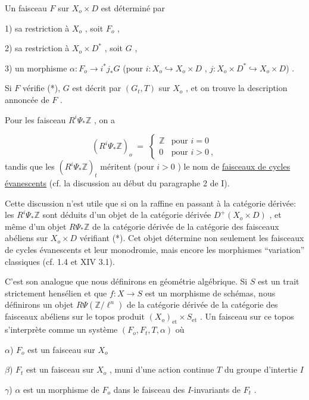 Un faisceau $F$ sur $X_o \times D$ est déterminé par

1) sa restriction à $X_o$ , soit $F_o$ ,

2) sa restriction à $X_o \times D^*$ , soit $G$ ,

3) un morphisme $\alpha : F_o \longrightarrow i^*j_*G$ (pour $i : X_o \hookrightarrow X_o \times D$ , $j : X_o \times D^* \hookrightarrow X_o \times D$) .

Si $F$ vérifie (*), $G$ est décrit par $(G_t, T)$ sur $X_o$ , et on trouve la description annoncée de $F$ .

Pour les faisceau $R^i \Psi_* \mathbb{Z}$ , on a

\begin{equation*}
(R^i \Psi_* \mathbb{Z})_o \;=\; \begin{cases} \mathbb{Z} & \text{pour } i = 0 \\ 0 & \text{pour } i > 0 \ , \end{cases}
\end{equation*}
tandis que les $(R^i \Psi_* \mathbb{Z} )_t$ méritent (pour $i > 0$ ) le nom de \underline{faisceaux de cycles évanescents} (cf. la discussion au début du paragraphe 2 de I).



Cette discussion n'est utile que si on la raffine en passant à la catégorie dérivée: les $R^i \Psi_* \mathbb{Z}$ sont déduits d'un objet de la catégorie dérivée $D^+(X_o \times D)$ , et même d'un objet $R\Psi_* \mathbb{Z}$ de la catégorie dérivée de la catégorie des faisceaux abéliens sur $X_o \times D$ vérifiant (*). Cet objet détermine non seulement les faisceaux de cycles évanescents et leur monodromie, mais encore les morphismes ``variation'' classiques (cf. 1.4 et XIV 3.1).

C'est son analogue que nous définirons en géométrie algébrique. Si $S$ est un trait strictement hensélien et que $f : X \to S$ est un morphisme de schémas, nous définirons un objet $R\Psi(\mathbb{Z}/\ell^n)$ de la catégorie dérivée de la catégorie des faisceaux abéliens sur le topos produit $(X_o)_{\mathrm{et}} \times S_{\mathrm{et}}$ . Un faisceau sur ce topos s'interprète comme un système $(F_o, F_t, T,\alpha)$ où

$\alpha$)  $F_o$ est un faisceau sur $X_o$

$\beta$)  $F_t$ est un faisceau sur $X_o$ , muni d'une action continue $T$ du groupe d'intertie $I$

$\gamma$)  $\alpha$ est un morphisme de $F_o$ dans le faisceau des $I$-invariants de $F_t$ .

